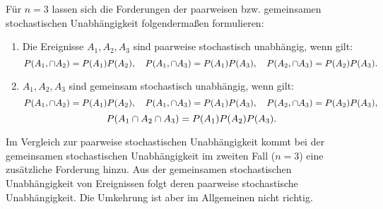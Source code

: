 \documentclass{lecture}
\begin{document}
    Für \(n = 3\) lassen sich die Forderungen der paarweisen bzw. gemeinsamen stochastischen Unabhängigkeit folgendermaßen formulieren:
    \begin{enumerate}[label=(\roman*)]
        \item Die Ereignisse \(A_1, A_2, A_3\) sind paarweise stochastisch unabhängig, wenn gilt:
        \[
            P\parentheses*{A_1, \cap A_2} = P\parentheses*{A_1}P\parentheses*{A_2}, \quad P\parentheses*{A_1, \cap A_3} = P\parentheses*{A_1}P\parentheses*{A_3}, \quad P\parentheses*{A_2, \cap A_3} = P\parentheses*{A_2}P\parentheses*{A_3}.
        \]
        \item \(A_1, A_2, A_3\) sind gemeinsam stochastisch unabhängig, wenn gilt:
        \[
            P\parentheses*{A_1, \cap A_2} = P\parentheses*{A_1}P\parentheses*{A_2}, \quad P\parentheses*{A_1, \cap A_3} = P\parentheses*{A_1}P\parentheses*{A_3}, \quad P\parentheses*{A_2, \cap A_3} = P\parentheses*{A_2}P\parentheses*{A_3},
        \]
        \[
            P\parentheses*{A_1 \cap A_2 \cap A_3} = P\parentheses*{A_1}P\parentheses*{A_2}P\parentheses*{A_3}.
        \]
    \end{enumerate}
    Im Vergleich zur paarweise stochastischen Unabhängigkeit kommt bei der gemeinsamen stochastischen Unabhängigkeit im zweiten Fall (\(n = 3\)) eine zusätzliche Forderung hinzu.
    Aus der gemeinsamen stochastischen Unabhängigkeit von Ereignissen folgt deren paarweise stochastische Unabhängigkeit.
    Die Umkehrung ist aber im Allgemeinen nicht richtig.
\end{document}
